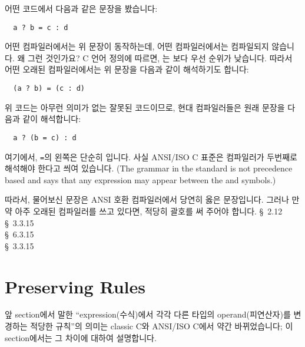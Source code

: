 \begin{faq}
        어떤 코드에서 다음과 같은 문장을 봤습니다:
\begin{verbatim}
  a ? b = c : d
\end{verbatim}
        어떤 컴파일러에서는 위 문장이 동작하는데, 어떤 컴파일러에서는 컴파일되지 않습니다.
        왜 그런 것인가요?
\A
        C 언어 정의에 따르면, \TT{=}는 보다 우선 순위가 낮습니다. 따라서 어떤 오래된
        컴파일러에서는 위 문장을 다음과 같이 해석하기도 합니다:
\begin{verbatim}
  (a ? b) = (c : d)
\end{verbatim}
        위 코드는 아무런 의미가 없는 잘못된 코드이므로, 현대 컴파일러들은 원래 문장을 다음과 같이
        해석합니다:
\begin{verbatim}
  a ? (b = c) : d
\end{verbatim}
        여기에서, \verb+=+의 왼쪽은 단순히 입니다. 사실 ANSI/ISO C 표준은 컴파일러가
        두번째로 해석해야 한다고 씌여 있습니다. (The grammar in the standard is not
        precedence based and says that any expression may appear between
        the  and \TT{:} symbols.)

        따라서, 물어보신 문장은 ANSI 호환 컴파일러에서 당연히 옳은 문장입니다. 그러나 만약
        아주 오래된 컴파일러를 쓰고 있다면, 적당히 괄호를 써 주어야 합니다.
\R
        \cite{kr1} \S\ 2.12  \\
        \cite{ansi} \S\ 3.3.15 \\
        \cite{c89} \S\ 6.3.15 \\
        \cite{rationale} \S\ 3.3.15
\end{faq}

\section{Preserving Rules}
앞 section에서 말한 ``expression(수식)에서 각각 다른 타입의 operand(피연산자)를 
변경하는 적당한 규칙''의 의미는 classic C와 ANSI/ISO C에서 약간 바뀌었습니다;
이 section에서는 그 차이에 대하여 설명합니다.

